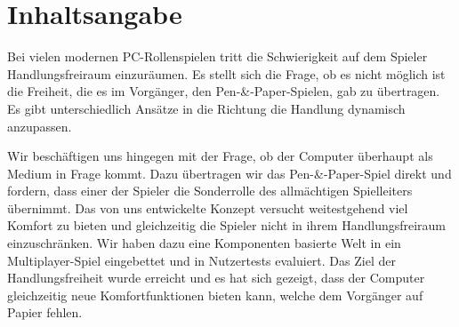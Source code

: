 \chapter*{Inhaltsangabe}

Bei vielen modernen PC-Rollenspielen tritt die Schwierigkeit auf dem Spieler Handlungsfreiraum einzuräumen. Es stellt sich die Frage, ob es nicht möglich ist die Freiheit, die es im Vorgänger, den Pen-\&-Paper-Spielen, gab zu übertragen. Es gibt unterschiedlich Ansätze in die Richtung die Handlung dynamisch anzupassen.

Wir beschäftigen uns hingegen mit der Frage, ob der Computer überhaupt als Medium in Frage kommt. Dazu übertragen wir das Pen-\&-Paper-Spiel direkt und fordern, dass einer der Spieler die Sonderrolle des allmächtigen Spielleiters übernimmt. Das von uns entwickelte Konzept versucht weitestgehend viel Komfort zu bieten und gleichzeitig die Spieler nicht in ihrem Handlungsfreiraum einzuschränken. Wir haben dazu eine Komponenten basierte Welt in ein Multiplayer-Spiel eingebettet und in Nutzertests evaluiert. Das Ziel der Handlungsfreiheit wurde erreicht und es hat sich gezeigt, dass der Computer gleichzeitig neue Komfortfunktionen bieten kann, welche dem Vorgänger auf Papier fehlen.